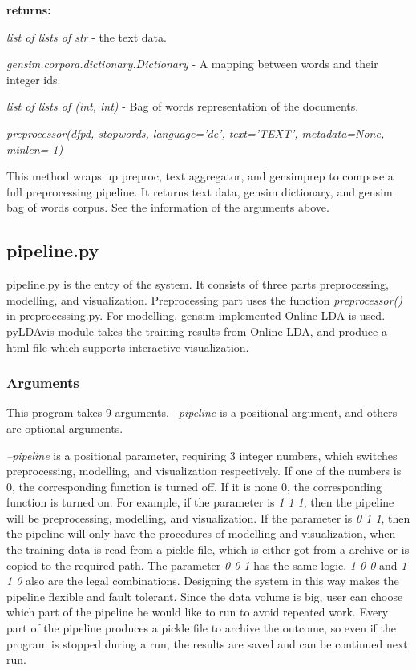 \documentclass{article} %
\begin{document}
    \textbf{returns:}
    \begin{compactitem}
        \item \textit{list of lists of str} - the text data.
        \item \textit{gensim.corpora.dictionary.Dictionary} - A mapping between words and their integer ids.
        \item \textit{list of lists of (int, int)} - Bag of words representation of the documents.
    \end{compactitem}

    \underline{\textit{preprocessor(df\textunderscore{}pd, stopwords, language='de', text='TEXT', metadata=None, min\textunderscore{}len=-1)}}

    This method wraps up preproc, text aggregator, and gensim\textunderscore{}prep to compose a full preprocessing pipeline. It returns text data, gensim dictionary, and gensim bag of words corpus. See the information of the arguments above.

    \subsection{pipeline.py}
    pipeline.py is the entry of the system. It consists of three parts preprocessing, modelling, and visualization. Preprocessing part uses the function \textit{preprocessor()} in preprocessing.py. For modelling, gensim implemented Online LDA is used. pyLDAvis module takes the training results from Online LDA, and produce a html file which supports interactive visualization.

    \subsubsection{Arguments}
    This program takes 9 arguments. \textit{--pipeline} is a positional argument, and others are optional arguments.

    \textit{--pipeline} is a positional parameter, requiring 3 integer numbers, which switches preprocessing, modelling, and visualization respectively. If one of the numbers is 0, the corresponding function is turned off. If it is none 0, the corresponding function is turned on. For example, if the parameter is \textit{1 1 1}, then the pipeline will be preprocessing, modelling, and visualization. If the parameter is \textit{0 1 1}, then the pipeline will only have the procedures of modelling and visualization, when the training data is read from a pickle file, which is either got from a archive or is copied to the required path. The parameter \textit{0 0 1} has the same logic. \textit{1 0 0} and \textit{1 1 0} also are the legal combinations. Designing the system in this way makes the pipeline flexible and fault tolerant. Since the data volume is big, user can choose which part of the pipeline he would like to run to avoid repeated work. Every part of the pipeline produces a pickle file to archive the outcome, so even if the program is stopped during a run, the results are saved and can be continued next run.
\end{document}
